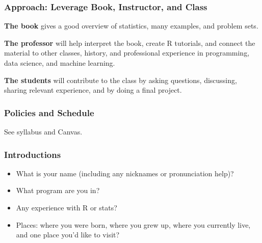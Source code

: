 \begin{frame}
  \frametitle{Approach: Leverage Book, Instructor, and Class}

  {\bf The book} gives a good overview of statistics, many examples, and
  problem sets.

  \pause

  {\bf The professor} will help interpret the book, create R
  tutorials, and connect the material to other classes, history, and
  professional experience in programming, data science, and machine
  learning.

  \pause

  {\bf The students} will contribute to the class by asking questions,
  discussing, sharing relevant experience, and by doing a final project.
  
\end{frame}


\begin{frame}
  \frametitle{Policies and Schedule}
  See syllabus and Canvas.
\end{frame}

\begin{frame}
  \frametitle{Introductions}
  \begin{itemize}
  \item What is your name (including any nicknames or pronunciation help)?
  \item What program are you in?
  \item Any experience with R or stats?
  \item Places: where you were born, where you grew up, where you currently live, and one place you'd like to visit?
  \end{itemize}
\end{frame}
